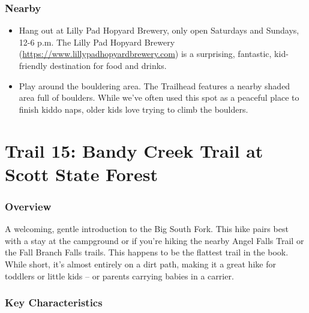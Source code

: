 \documentclass[
  letterpaper,
  DIV=11,
  numbers=noendperiod]{scrreprt}
\providecommand{\tightlist}{%
  \setlength{\itemsep}{0pt}\setlength{\parskip}{0pt}}\usepackage{longtable,booktabs,array}
\begin{document}
\subsection{Nearby}\label{nearby-13}

\begin{itemize}
\tightlist
\item
  Hang out at Lilly Pad Hopyard Brewery, only open Saturdays and
  Sundays, 12-6 p.m. The Lilly Pad Hopyard Brewery
  (\url{https://www.lillypadhopyardbrewery.com}) is a surprising,
  fantastic, kid-friendly destination for food and drinks.
\item
  Play around the bouldering area. The Trailhead features a nearby
  shaded area full of boulders. While we've often used this spot as a
  peaceful place to finish kiddo naps, older kids love trying to climb
  the boulders.
\end{itemize}

\chapter{Trail 15: Bandy Creek Trail at Scott State
Forest}\label{trail-15-bandy-creek-trail-at-scott-state-forest}

\subsection{Overview}\label{overview-15}

A welcoming, gentle introduction to the Big South Fork. This hike pairs
best with a stay at the campground or if you're hiking the nearby Angel
Falls Trail or the Fall Branch Falls trails. This happens to be the
flattest trail in the book. While short, it's almost entirely on a dirt
path, making it a great hike for toddlers or little kids -- or parents
carrying babies in a carrier.

\subsection{Key Characteristics}\label{key-characteristics-13}
\end{document}

